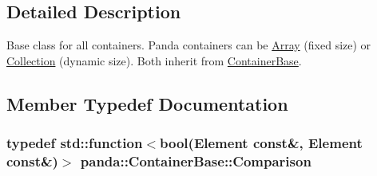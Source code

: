 \subsection{Detailed Description}
Base class for all containers. Panda containers can be \hyperlink{classpanda_1_1Array}{Array} (fixed size) or \hyperlink{classpanda_1_1Collection}{Collection} (dynamic size). Both inherit from \hyperlink{classpanda_1_1ContainerBase}{ContainerBase}. 

\subsection{Member Typedef Documentation}
\hypertarget{classpanda_1_1ContainerBase_a5269fda4f420b52d6ed9c0dac548559e}{
\subsubsection[{Comparison}]{\setlength{\rightskip}{0pt plus 5cm}typedef std::function$<$bool({\bf Element} const\&, {\bf Element} const\&)$>$ {\bf panda::ContainerBase::Comparison}}}
\label{classpanda_1_1ContainerBase_a5269fda4f420b52d6ed9c0dac548559e}


